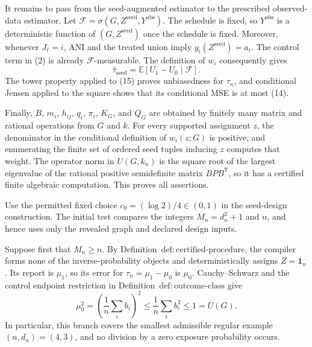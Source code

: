 It remains to pass from the seed-augmented estimator to the prescribed
observed-data estimator.  Let
\(\mathcal F=\sigma(G,Z^{\mathrm{seed}},Y^{\mathrm{obs}})\).  The schedule
is fixed, so \(Y^{\mathrm{obs}}\) is a deterministic function of
\((G,Z^{\mathrm{seed}})\) once the schedule is fixed.  Moreover, whenever
\(J_\ell=i\), ANI and the treated union imply
\(y_i(Z^{\mathrm{seed}})=a_i\).  The control term in (2) is already
\(\mathcal F\)-measurable.  The definition of \(w_i\) consequently gives
\[
\widehat\tau_{\mathrm{seed}}
=\mathbb E[U_1-U_0\mid\mathcal F].
\tag{15}
\]
The tower property applied to (15) proves unbiasedness for \(\tau_n\), and
conditional Jensen applied to the square shows that its conditional MSE is
at most (14).

Finally, \(B\), \(m_i\), \(h_{ij}\), \(q_i\), \(\pi_i\), \(K_G\), and
\(Q_G\) are obtained by finitely many matrix and rational operations from
\(G\) and \(k\).  For every supported assignment \(z\), the denominator in
the conditional definition of \(w_i(z;G)\) is positive, and enumerating the
finite set of ordered seed tuples inducing \(z\) computes that weight.
The operator norm in \(U(G,k_n)\) is the square root of the largest
eigenvalue of the rational positive semidefinite matrix
\(BPB^{\mathsf T}\), so it has a certified finite algebraic computation.
This proves all assertions.

Use the permitted fixed choice \(c_0=(\log 2)/4\in(0,1)\) in the
seed-design construction.
The initial test compares the integers \(M_n=d_n^2+1\) and \(n\), and hence
uses only the revealed graph and declared design inputs.

Suppose first that \(M_n\ge n\).  By
Definition~\(\mathrm{def{:}certified\mbox{-}procedure}\), the compiler forms
none of the inverse-probability objects and deterministically assigns
\(Z=\mathbf 1_n\).  Its report is \(\mu_1\), so its error for
\(\tau_n=\mu_1-\mu_0\) is \(\mu_0\).  Cauchy--Schwarz and the control
endpoint restriction in Definition~\(\mathrm{def{:}outcome\mbox{-}class}\)
give
\[
\mu_0^2
=\left(\frac1n\sum_i b_i\right)^2
\le\frac1n\sum_i b_i^2
\le1=\overline U(G).
\tag{16}
\]
In particular, this branch covers the smallest admissible regular example
\((n,d_n)=(4,3)\), and no division by a zero exposure probability occurs.

